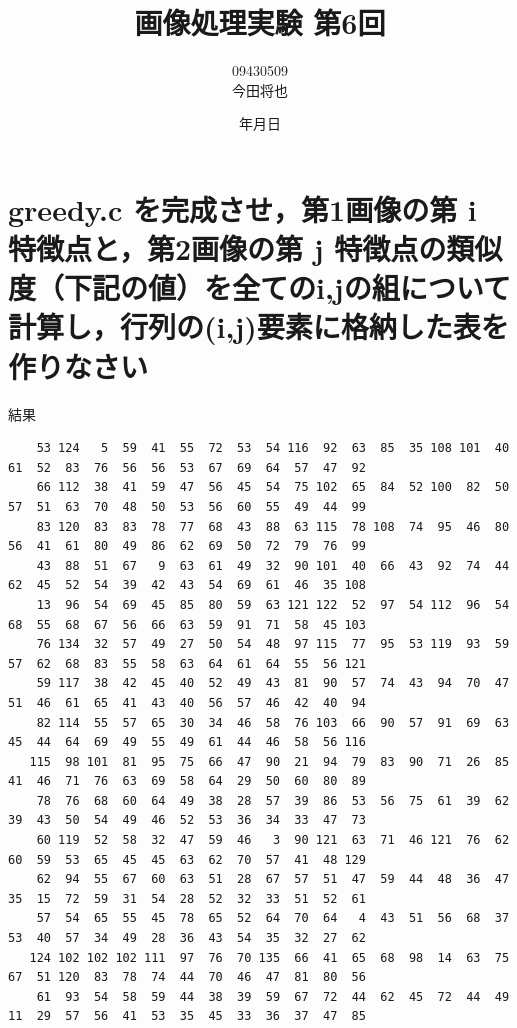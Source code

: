 \documentclass[11pt]{jarticle}
\begin{document}
\title{画像処理実験 第6回}
\author{09430509\\今田将也}
\date{\number\year 年\number\month 月\number\day 日}
\maketitle

\section{greedy.c を完成させ，第1画像の第 i 特徴点と，第2画像の第 j 特徴点の類似度（下記の値）を全てのi,jの組について計算し，行列の(i,j)要素に格納した表を作りなさい}
結果
\tiny
\begin{verbatim}
    53 124   5  59  41  55  72  53  54 116  92  63  85  35 108 101  40  61  52  83  76  56  56  53  67  69  64  57  47  92 
    66 112  38  41  59  47  56  45  54  75 102  65  84  52 100  82  50  57  51  63  70  48  50  53  56  60  55  49  44  99 
    83 120  83  83  78  77  68  43  88  63 115  78 108  74  95  46  80  56  41  61  80  49  86  62  69  50  72  79  76  99 
    43  88  51  67   9  63  61  49  32  90 101  40  66  43  92  74  44  62  45  52  54  39  42  43  54  69  61  46  35 108 
    13  96  54  69  45  85  80  59  63 121 122  52  97  54 112  96  54  68  55  68  67  56  66  63  59  91  71  58  45 103 
    76 134  32  57  49  27  50  54  48  97 115  77  95  53 119  93  59  57  62  68  83  55  58  63  64  61  64  55  56 121 
    59 117  38  42  45  40  52  49  43  81  90  57  74  43  94  70  47  51  46  61  65  41  43  40  56  57  46  42  40  94 
    82 114  55  57  65  30  34  46  58  76 103  66  90  57  91  69  63  45  44  64  69  49  55  49  61  44  46  58  56 116 
   115  98 101  81  95  75  66  47  90  21  94  79  83  90  71  26  85  41  46  71  76  63  69  58  64  29  50  60  80  89 
    78  76  68  60  64  49  38  28  57  39  86  53  56  75  61  39  62  39  43  50  54  49  46  52  53  36  34  33  47  73 
    60 119  52  58  32  47  59  46   3  90 121  63  71  46 121  76  62  60  59  53  65  45  45  63  62  70  57  41  48 129 
    62  94  55  67  60  63  51  28  67  57  51  47  59  44  48  36  47  35  15  72  59  31  54  28  52  32  33  51  52  61 
    57  54  65  55  45  78  65  52  64  70  64   4  43  51  56  68  37  53  40  57  34  49  28  36  43  54  35  32  27  62 
   124 102 102 102 111  97  76  70 135  66  41  65  68  98  14  63  75  67  51 120  83  78  74  44  70  46  47  81  80  56 
    61  93  54  58  59  44  38  39  59  67  72  44  62  45  72  44  49  11  29  57  56  41  53  35  45  33  36  37  47  85 

\end{verbatim}
\end{document}
